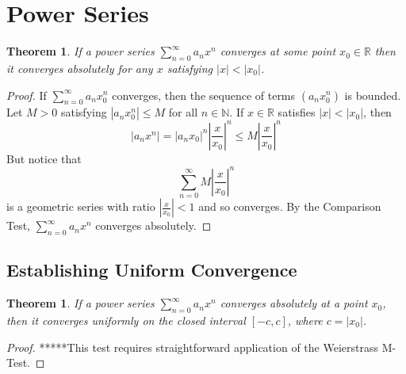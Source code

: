 \documentclass[10pt]{report}
\newtheorem{thm2}{Theorem}[section]
\newtheorem{thm3}{Theorem}[subsection]
\begin{document}
\section{Power Series}
\begin{thm2}
If a power series $\sum_{n=0}^\infty a_nx^n$ converges at some point $x_0\in\mathbb{R}$ then it converges absolutely for any $x$ satisfying $|x|<|x_0|$.
\end{thm2}
\begin{proof}
If $\sum_{n=0}^\infty a_nx_0^n$ converges, then the sequence of terms $(a_nx_0^n)$ is bounded. Let $M>0$ satisfying $|a_nx_0^n|\leq M$ for all $n\in\mathbb{N}$. If $x\in\mathbb{R}$ satisfies $|x|<|x_0|$, then
$$|a_nx^n| = |a_nx_0|^n\left|\frac{x}{x_0}\right|^n\leq M \left|\frac{x}{x_0}\right|^n$$
But notice that
$$\sum_{n=0}^\infty M\left|\frac{x}{x_0}\right|^n$$
is a geometric series with ratio $\left|\frac{x}{x_0}\right|<1$ and so converges. By the Comparison Test, $\sum_{n=0}^\infty a_nx^n$ converges absolutely.
\end{proof}
\subsection{Establishing Uniform Convergence}
\begin{thm3}
If a power series $\sum_{n=0}^\infty a_nx^n$ converges absolutely at a point $x_0$, then it converges uniformly on the closed interval $[-c,c]$, where $c=|x_0|$.
\end{thm3}
\begin{proof}
*****This test requires straightforward application of the Weierstrass M-Test.
\end{proof}
\end{document}
